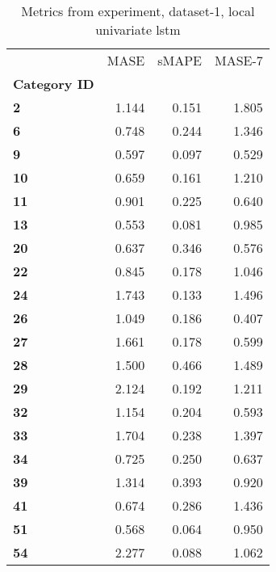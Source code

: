 \begin{table}[h]
\centering
\caption{Metrics from experiment, dataset-1, local univariate lstm}
\label{table:local-univariate-lstm-dataset-1}
\begin{tabular}{lrrr}
\toprule
{} &   MASE &  sMAPE &  MASE-7 \\
\textbf{Category ID} &        &        &         \\
\midrule
\textbf{2          } &  1.144 &  0.151 &   1.805 \\
\textbf{6          } &  0.748 &  0.244 &   1.346 \\
\textbf{9          } &  0.597 &  0.097 &   0.529 \\
\textbf{10         } &  0.659 &  0.161 &   1.210 \\
\textbf{11         } &  0.901 &  0.225 &   0.640 \\
\textbf{13         } &  0.553 &  0.081 &   0.985 \\
\textbf{20         } &  0.637 &  0.346 &   0.576 \\
\textbf{22         } &  0.845 &  0.178 &   1.046 \\
\textbf{24         } &  1.743 &  0.133 &   1.496 \\
\textbf{26         } &  1.049 &  0.186 &   0.407 \\
\textbf{27         } &  1.661 &  0.178 &   0.599 \\
\textbf{28         } &  1.500 &  0.466 &   1.489 \\
\textbf{29         } &  2.124 &  0.192 &   1.211 \\
\textbf{32         } &  1.154 &  0.204 &   0.593 \\
\textbf{33         } &  1.704 &  0.238 &   1.397 \\
\textbf{34         } &  0.725 &  0.250 &   0.637 \\
\textbf{39         } &  1.314 &  0.393 &   0.920 \\
\textbf{41         } &  0.674 &  0.286 &   1.436 \\
\textbf{51         } &  0.568 &  0.064 &   0.950 \\
\textbf{54         } &  2.277 &  0.088 &   1.062 \\
\bottomrule
\end{tabular}
\end{table}
